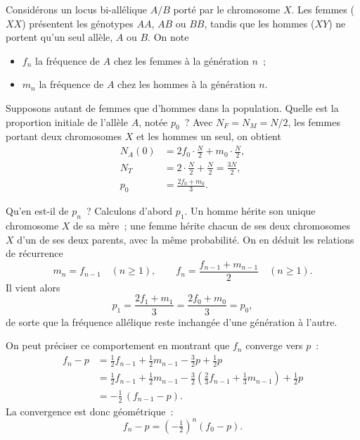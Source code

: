 \begin{exemple}
Considérons un locus bi-allélique $A/B$ porté par le chromosome $X$. Les femmes
($XX$) présentent les génotypes $AA$, $AB$ ou $BB$, tandis que les hommes
($XY$) ne portent qu'un seul allèle, $A$ ou $B$. On note
\begin{itemize}
  \item $f_n$ la fréquence de $A$ chez les femmes à la génération $n$~;
  \item $m_n$ la fréquence de $A$ chez les hommes à la génération $n$.
\end{itemize}

Supposons autant de femmes que d'hommes dans la population. Quelle est la
proportion initiale de l'allèle $A$, notée $p_0$~? Avec $N_F = N_M = N/2$, les
femmes portant deux chromosomes $X$ et les hommes un seul, on obtient
\begin{align*}
N_A(0) &= 2 f_0 \cdot \tfrac{N}{2} + m_0 \cdot \tfrac{N}{2}, \\
N_T    &= 2 \cdot \tfrac{N}{2} + \tfrac{N}{2} = \tfrac{3N}{2}, \\
p_0    &= \frac{2 f_0 + m_0}{3}.
\end{align*}

Qu'en est-il de $p_n$~? Calculons d'abord $p_1$. Un homme hérite son unique
chromosome $X$ de sa mère~; une femme hérite chacun de ses deux chromosomes $X$
d'un de ses deux parents, avec la même probabilité. On en déduit les relations
de récurrence
$$
m_n = f_{n-1} \quad (n \geq 1), \qquad
f_n = \frac{f_{n-1} + m_{n-1}}{2} \quad (n \geq 1).
$$
Il vient alors
$$
p_1 = \frac{2 f_1 + m_1}{3} = \frac{2 f_0 + m_0}{3} = p_0 ,
$$
de sorte que la fréquence allélique reste inchangée d'une génération à l'autre.

On peut préciser ce comportement en montrant que $f_n$ converge vers $p$~:
\begin{align*}
f_n - p
&= \tfrac{1}{2} f_{n-1} + \tfrac{1}{2} m_{n-1} - \tfrac{3}{2} p + \tfrac{1}{2} p \\
&= \tfrac{1}{2} f_{n-1} + \tfrac{1}{2} m_{n-1}
   - \tfrac{3}{2}\left( \tfrac{2}{3} f_{n-1} + \tfrac{1}{3} m_{n-1} \right)
   + \tfrac{1}{2} p \\
&= -\tfrac{1}{2}\,(f_{n-1} - p).
\end{align*}
La convergence est donc géométrique~:
$$
f_n - p = \left( -\tfrac{1}{2} \right)^n (f_0 - p).
$$
\end{exemple}


